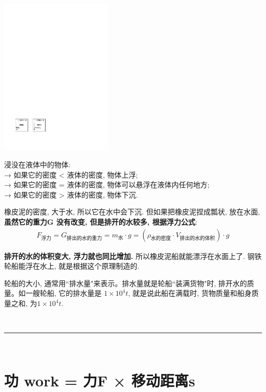 \documentclass[UTF8]{ctexart}
\begin{document}
\includegraphics[width=0.4\textwidth]{img/0044.pdf}

浸没在液体中的物体: \\
→ 如果它的密度 < 液体的密度, 物体上浮;  \\
→ 如果它的密度 = 液体的密度, 物体可以悬浮在液体内任何地方; \\
→ 如果它的密度 > 液体的密度, 物体下沉. \\

\begin{tcolorbox}[title = {例},boxrule={0.1em},colframe={black!10}, colback={black!3},colbacktitle={black!10},coltitle={black}]
橡皮泥的密度, 大于水, 所以它在水中会下沉. 但如果把橡皮泥捏成瓢状, 放在水面, \textbf{虽然它的重力G 没有改变, 但是排开的水较多, 根据浮力公式}:  	
\begin{align*}
	\boxed{	
	F_{\text{浮力}}=G_{\text{排出的水的重力}}=m_{\text{水}}\cdot g=\left( \rho _{\text{水的密度}}\cdot V_{\text{排出的水的体积}} \right) \cdot g
	}
\end{align*}

\textbf{排开的水的体积变大, 浮力就也同比增加.} 所以橡皮泥船就能漂浮在水面上了. 钢铁轮船能浮在水上, 就是根据这个原理制造的. 
\end{tcolorbox}

轮船的大小, 通常用``排水量"来表示。排水量就是轮船``装满货物"时, 排开水的质量。如一艘轮船, 它的排水量是 $1×10^4 t$, 就是说此船在满载时, 货物质量和船身质量之和, 为$1×10^4 t$.



~\\
\hrule
~\\

\section{功 work = 力F × 移动距离s}
\end{document}

